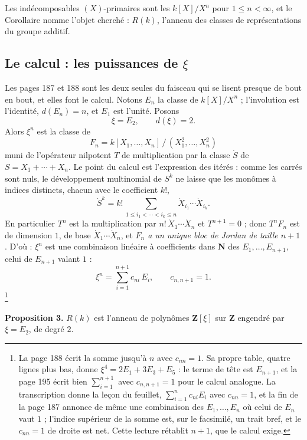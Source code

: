 \documentclass[11pt,a4paper]{article}
\begin{document}
Les indécomposables $(X)$-primaires sont les $k[X]/X^{n}$ pour $1 \leqslant n
< \infty$, et le Corollaire nomme l'objet cherché : $R(k)$, l'anneau des
classes de représentations du groupe additif.

\subsection*{Le calcul : les puissances de $\xi$}

Les pages 187 et 188 sont les deux seules du faisceau qui se lisent presque de
bout en bout, et elles font le calcul. Notons $E_{n}$ la classe de
$k[X]/X^{n}$ ; l'involution est l'identité, $d(E_{n}) = n$, et $E_{1}$ est
l'unité. Posons
\[
\xi = E_{2} , \qquad d(\xi) = 2 .
\]
Alors $\xi^{n}$ est la classe de
\[
F_{n} = k[X_{1}, \ldots, X_{n}]\,/\,(X_{1}^{2}, \ldots, X_{n}^{2})
\]
muni de l'opérateur nilpotent $T$ de multiplication par la classe $\dot{S}$ de
$S = X_{1} + \cdots + X_{n}$. Le point du calcul est l'expression des
itérés : comme les carrés sont nuls, le développement multinomial de $S^{k}$ ne
laisse que les monômes à indices distincts, chacun avec le coefficient $k!$,
\[
\dot{S}^{k} = k!\,\sum_{1 \leqslant i_{1} < \cdots < i_{k} \leqslant n}
\dot{X}_{i_{1}} \cdots \dot{X}_{i_{k}} .
\]
En particulier $T^{n}$ est la multiplication par
$n!\,\dot{X}_{1}\cdots\dot{X}_{n}$ et $T^{n+1} = 0$ ; donc $T^{n}F_{n}$ est de
dimension $1$, de base $\dot{X}_{1}\cdots\dot{X}_{n}$, et
\emph{$F_{n}$ a un unique bloc de Jordan de taille $n+1$}. D'où :
$\xi^{n}$ est une combinaison linéaire à coefficients dans $\mathbf{N}$ des
$E_{1}, \ldots, E_{n+1}$, celui de $E_{n+1}$ valant $1$ :
\[
\xi^{n} = \sum_{i=1}^{n+1} c_{ni}\,E_{i} ,
\qquad c_{n,n+1} = 1 .
\]
\footnote{La page 188 écrit la somme jusqu'à $n$ avec $c_{nn} = 1$. Sa propre
table, quatre lignes plus bas, donne $\xi^{4} = 2E_{1} + 3E_{3} + E_{5}$ : le
terme de tête est $E_{n+1}$, et la page 195 écrit bien $\sum_{i=1}^{n+1}$ avec
$c_{n,n+1} = 1$ pour le calcul analogue. La transcription donne la leçon du
feuillet, $\sum_{i=1}^{n} c_{ni}E_{i}$ avec $c_{nn} = 1$, et la fin de la
page 187 annonce de même une combinaison des $E_{1}, \ldots, E_{n}$ où celui
de $E_{n}$ vaut $1$ ; l'indice supérieur de la somme est, sur le facsimilé, un
trait bref, et le $c_{nn} = 1$ de droite est net. Cette lecture rétablit
$n+1$, que le calcul exige.}

\textbf{Proposition 3.} $R(k)$ est l'anneau de polynômes $\mathbf{Z}[\xi]$ sur
$\mathbf{Z}$ engendré par $\xi = E_{2}$, de degré $2$.
\end{document}
